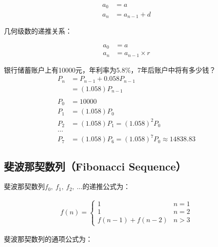 \documentclass[12pt, openany, oneside]{book}
\begin{document}
\begin{align*}
	a_0 & = a           \\
	a_n & = a_{n-1} + d
\end{align*}

几何级数的递推关系：

\vspace{-1.5cm}

\begin{align*}
	a_0 & = a                \\
	a_n & = a_{n-1} \times r
\end{align*}

\begin{tcolorbox}
	银行储蓄账户上有10000元，年利率为5.8\%，7年后账户中将有多少钱？
	\begin{align*}
		P_n & = P_{n-1} + 0.058P_{n-1}                      \\
		    & = (1.058)P_{n-1}                              \\
		\\
		P_0 & = 10000                                       \\
		P_1 & = (1.058)P_0                                  \\
		P_2 & = (1.058)P_1 = (1.058)^2 P_0                  \\
		\dots                                               \\
		P_7 & = (1.058)P_6 = (1.058)^7 P_0 \approx 14838.83
	\end{align*}
\end{tcolorbox}

\vspace{0.5cm}

\subsection{斐波那契数列（Fibonacci Sequence）}

斐波那契数列$ f_0,\ f_1,\ f_2,\ \dots $的递推公式为：

\begin{align*}
	f(n) = \begin{cases}
		1               & n = 1 \\
		1               & n = 2 \\
		f(n-1) + f(n-2) & n > 3
	\end{cases}
\end{align*}

斐波那契数列的通项公式为：
\end{document}
